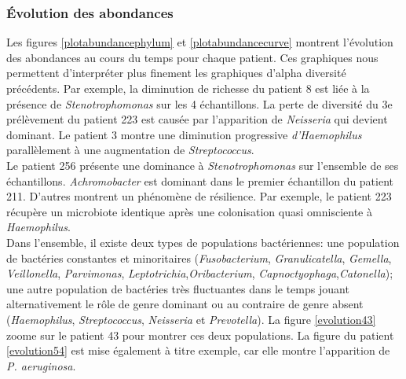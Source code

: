 \documentclass[12pt,a4paper]{article}
\begin{document}
\subsubsection{Évolution des abondances}
Les figures \ref{plotabundancephylum} et \ref{plotabundancecurve} montrent l’évolution des abondances au cours du temps pour chaque patient. Ces graphiques nous permettent d’interpréter plus finement les graphiques d’alpha diversité précédents.
Par exemple, la diminution de richesse du patient 8 est liée à la présence de \textit{Stenotrophomonas} sur les 4 échantillons.
La perte de diversité du 3e prélèvement du patient 223 est causée par l'apparition de \textit{Neisseria} qui devient dominant.
Le patient 3 montre une diminution progressive \textit{d’Haemophilus} parallèlement à une augmentation de \textit{Streptococcus}. \\
Le patient 256 présente une dominance à \textit{Stenotrophomonas} sur l'ensemble de ses échantillons. \textit{Achromobacter} est dominant dans le premier échantillon du patient 211.
D’autres montrent un phénomène de résilience. Par exemple, le patient 223 récupère un microbiote identique après une colonisation quasi omnisciente à \textit{Haemophilus}. \\
Dans l’ensemble, il existe deux types de populations bactériennes: une population de bactéries constantes et minoritaires (\textit{Fusobacterium}, \textit{Granulicatella}, \textit{Gemella}, \textit{Veillonella}, \textit{Parvimonas}, \textit{Leptotrichia},\textit{Oribacterium}, \textit{Capnoctyophaga},\textit{Catonella}); une autre population de bactéries très fluctuantes dans le temps jouant alternativement le rôle de genre dominant ou au contraire de genre absent (\textit{Haemophilus}, \textit{Streptococcus}, \textit{Neisseria} et \textit{Prevotella}).
La figure \ref{evolution43} zoome sur le patient 43 pour montrer ces deux populations. La figure du patient \ref{evolution54} est mise également à titre exemple, car elle montre l’apparition de \textit{P. aeruginosa}. \\
\end{document}
